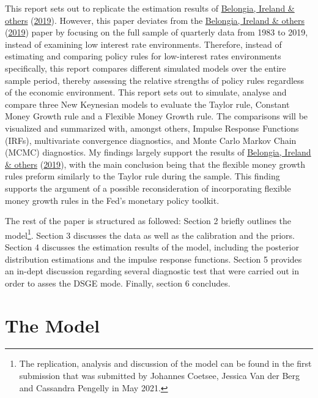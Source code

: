 \documentclass[11pt,preprint, authoryear]{elsarticle}
\numberwithin{equation}{section}
\numberwithin{figure}{section}
\numberwithin{table}{section}
\let\rmarkdownfootnote\footnote%
\def\footnote{\protect\rmarkdownfootnote}
\begin{document}
This report sets out to replicate the estimation results of
\protect\hyperlink{ref-belongia2019reconsideration}{Belongia, Ireland \&
others} (\protect\hyperlink{ref-belongia2019reconsideration}{2019}).
However, this paper deviates from the
\protect\hyperlink{ref-belongia2019reconsideration}{Belongia, Ireland \&
others} (\protect\hyperlink{ref-belongia2019reconsideration}{2019})
paper by focusing on the full sample of quarterly data from 1983 to
2019, instead of examining low interest rate environments. Therefore,
instead of estimating and comparing policy rules for low-interest rates
environments specifically, this report compares different simulated
models over the entire sample period, thereby assessing the relative
strengths of policy rules regardless of the economic environment. This
report sets out to simulate, analyse and compare three New Keynesian
models to evaluate the Taylor rule, Constant Money Growth rule and a
Flexible Money Growth rule. The comparisons will be visualized and
summarized with, amongst others, Impulse Response Functions (IRFs),
multivariate convergence diagnostics, and Monte Carlo Markov Chain
(MCMC) diagnostics. My findings largely support the results of
\protect\hyperlink{ref-belongia2019reconsideration}{Belongia, Ireland \&
others} (\protect\hyperlink{ref-belongia2019reconsideration}{2019}),
with the main conclusion being that the flexible money growth rules
preform similarly to the Taylor rule during the sample. This finding
supports the argument of a possible reconsideration of incorporating
flexible money growth rules in the Fed's monetary policy toolkit.

The rest of the paper is structured as followed: Section 2 briefly
outlines the
model\footnote{The replication, analysis and discussion of the model can be found in the first submission that was submitted by Johannes Coetsee, Jessica Van der Berg and Cassandra Pengelly in May 2021.}.
Section 3 discusses the data as well as the calibration and the priors.
Section 4 discusses the estimation results of the model, including the
posterior distribution estimations and the impulse response functions.
Section 5 provides an in-dept discussion regarding several diagnostic
test that were carried out in order to asses the DSGE mode. Finally,
section 6 concludes.

\newpage

\hypertarget{the-model}{%
\section{The Model}\label{the-model}}
\end{document}
